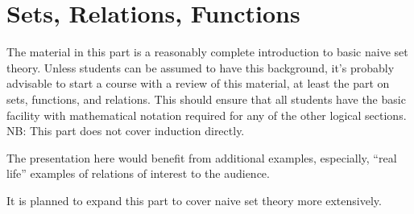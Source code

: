 \documentclass[../../include/open-logic-part]{subfiles}
\begin{document}
\part{Sets, Relations, Functions}

\begin{editorial}
  The material in this part is a reasonably complete introduction to
  basic naive set theory.  Unless students can be assumed to have this
  background, it's probably advisable to start a course with a review
  of this material, at least the part on sets, functions, and
  relations.  This should ensure that all students have the basic
  facility with mathematical notation required for any of the other
  logical sections.  NB: This part does not cover induction directly.

  The presentation here would benefit from additional examples,
  especially, ``real life'' examples of relations of interest to the
  audience.

  It is planned to expand this part to cover naive set theory more
  extensively.
\end{editorial}





\OLEndPartHook
\end{document}
